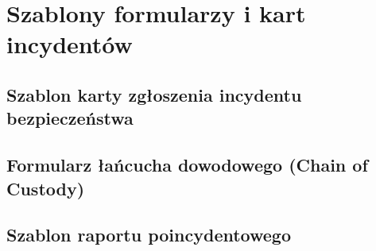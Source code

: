 \chapter{Szablony formularzy i kart incydentów}\label{app:szablony-formularzy}

\section{Szablon karty zgłoszenia incydentu bezpieczeństwa}\label{app:karta-zgloszenia}

\section{Formularz łańcucha dowodowego (Chain of Custody)}\label{app:formularz-dowodowy}

\section{Szablon raportu poincydentowego}\label{app:szablon-raportu}
